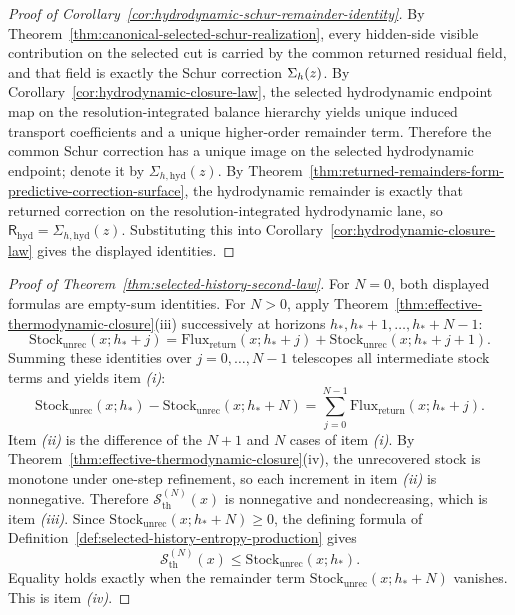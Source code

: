 \begin{proof}[Proof of Corollary~\ref{cor:hydrodynamic-schur-remainder-identity}]
\label{proof:cor:hydrodynamic-schur-remainder-identity}
By Theorem~\ref{thm:canonical-selected-schur-realization}, every hidden-side
visible contribution on the selected cut is carried by the common returned
residual field, and that field is exactly the Schur correction
\(\Sigma_{h}(z)\). By Corollary~\ref{cor:hydrodynamic-closure-law}, the
selected hydrodynamic endpoint map on the resolution-integrated balance
hierarchy yields unique induced transport coefficients and a unique higher-order
remainder term. Therefore the common Schur correction has a unique image on the
selected hydrodynamic endpoint; denote it by \(\Sigma_{h,\mathrm{hyd}}(z)\). By
Theorem~\ref{thm:returned-remainders-form-predictive-correction-surface}, the
hydrodynamic remainder is exactly that returned correction on the
resolution-integrated hydrodynamic lane, so
\(\mathsf R_{\mathrm{hyd}}=\Sigma_{h,\mathrm{hyd}}(z)\). Substituting this into
Corollary~\ref{cor:hydrodynamic-closure-law} gives the displayed identities.
\end{proof}


\begin{proof}[Proof of Theorem~\ref{thm:selected-history-second-law}]
\label{proof:thm:selected-history-second-law}
For \(N=0\), both displayed formulas are empty-sum identities. For \(N>0\),
apply Theorem~\ref{thm:effective-thermodynamic-closure}(iii) successively at
horizons \(h_\ast,h_\ast+1,\dots,h_\ast+N-1\):
\[
\mathrm{Stock}_{\mathrm{unrec}}(x;h_\ast+j)
=
\mathrm{Flux}_{\mathrm{return}}(x;h_\ast+j)
+
\mathrm{Stock}_{\mathrm{unrec}}(x;h_\ast+j+1).
\]
Summing these identities over \(j=0,\dots,N-1\) telescopes all intermediate
stock terms and yields item \emph{(i)}:
\[
\mathrm{Stock}_{\mathrm{unrec}}(x;h_\ast)
-
\mathrm{Stock}_{\mathrm{unrec}}(x;h_\ast+N)
=
\sum_{j=0}^{N-1}\mathrm{Flux}_{\mathrm{return}}(x;h_\ast+j).
\]
Item \emph{(ii)} is the difference of the \(N+1\) and \(N\) cases of item
\emph{(i)}. By Theorem~\ref{thm:effective-thermodynamic-closure}(iv), the
unrecovered stock is monotone under one-step refinement, so each increment in
item \emph{(ii)} is nonnegative. Therefore
\(\mathcal S_{\mathrm{th}}^{(N)}(x)\) is nonnegative and nondecreasing, which
is item \emph{(iii)}. Since
\(\mathrm{Stock}_{\mathrm{unrec}}(x;h_\ast+N)\ge 0\), the defining formula of
Definition~\ref{def:selected-history-entropy-production} gives
\[
\mathcal S_{\mathrm{th}}^{(N)}(x)
\le
\mathrm{Stock}_{\mathrm{unrec}}(x;h_\ast).
\]
Equality holds exactly when the remainder term
\(\mathrm{Stock}_{\mathrm{unrec}}(x;h_\ast+N)\) vanishes. This is item
\emph{(iv)}.
\end{proof}

